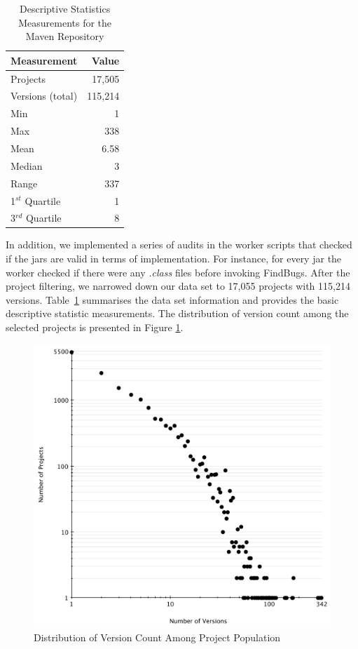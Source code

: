 \documentclass[conference]{llncs}
\begin{document}
\begin{table}
\centering
\caption{Descriptive Statistics Measurements for the Maven Repository}
\label{tbl:repository}
\begin{tabular}{l r}
\hline
Measurement & Value\\
 \hline
Projects & 17,505\\
Versions (total) & 115,214\\
Min & 1\\
Max & 338\\
Mean & 6.58\\
Median & 3\\
Range & 337\\
1$^{st}$ Quartile & 1\\
3$^{rd}$ Quartile & 8\\
\hline
\end{tabular}
\end{table}

In addition, we implemented a series of audits in the worker scripts that
checked if the {\sc jar}s are valid in terms of implementation. For instance,
for every {\sc jar} the worker checked if there were any {\it .class} files
before invoking FindBugs. After the project filtering, we narrowed down
our data set to 17,055 projects with 115,214 versions.
Table~\ref{tbl:repository} summarises the data set information and
provides the basic descriptive statistic measurements. The distribution of version
count among the selected projects is presented in Figure \ref{fig:version-count}.

\begin{figure}
	\centering
	\includegraphics[scale=0.6]{version_count.pdf}
	\caption{Distribution of
Version Count Among Project Population}
	\label{fig:version-count}
\end{figure}
\end{document}
